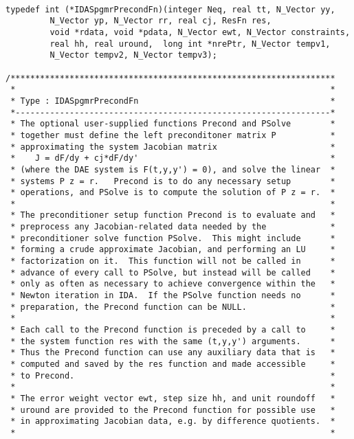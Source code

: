 \small
\begin{verbatim}
                        
typedef int (*IDASpgmrPrecondFn)(integer Neq, real tt, N_Vector yy,
         N_Vector yp, N_Vector rr, real cj, ResFn res, 
         void *rdata, void *pdata, N_Vector ewt, N_Vector constraints, 
         real hh, real uround,  long int *nrePtr, N_Vector tempv1, 
         N_Vector tempv2, N_Vector tempv3);
 
/******************************************************************
 *                                                                *           
 * Type : IDASpgmrPrecondFn                                       *
 *----------------------------------------------------------------*
 * The optional user-supplied functions Precond and PSolve        *
 * together must define the left preconditoner matrix P           *
 * approximating the system Jacobian matrix                       *
 *    J = dF/dy + cj*dF/dy'                                       *
 * (where the DAE system is F(t,y,y') = 0), and solve the linear  *
 * systems P z = r.   Precond is to do any necessary setup        *
 * operations, and PSolve is to compute the solution of P z = r.  *
 *                                                                *
 * The preconditioner setup function Precond is to evaluate and   *
 * preprocess any Jacobian-related data needed by the             *
 * preconditioner solve function PSolve.  This might include      *
 * forming a crude approximate Jacobian, and performing an LU     *
 * factorization on it.  This function will not be called in      *
 * advance of every call to PSolve, but instead will be called    *
 * only as often as necessary to achieve convergence within the   *
 * Newton iteration in IDA.  If the PSolve function needs no      *
 * preparation, the Precond function can be NULL.                 *
 *                                                                *
 * Each call to the Precond function is preceded by a call to     *
 * the system function res with the same (t,y,y') arguments.      *
 * Thus the Precond function can use any auxiliary data that is   *
 * computed and saved by the res function and made accessible     *
 * to Precond.                                                    *
 *                                                                *
 * The error weight vector ewt, step size hh, and unit roundoff   *
 * uround are provided to the Precond function for possible use   *
 * in approximating Jacobian data, e.g. by difference quotients.  *
 *                                                                *

\end{verbatim}
